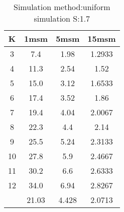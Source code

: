 \begin{table}[H]
\centering
\begin{tabular}{c|ccc}
K &1msm &5msm &15msm\\
\hline
3 & 7.4 & 1.98 & 1.2933\\
4 & 11.3 & 2.54 & 1.52\\
5 & 15.0 & 3.12 & 1.6533\\
6 & 17.4 & 3.52 & 1.86\\
7 & 19.4 & 4.04 & 2.0067\\
8 & 22.3 & 4.4 & 2.14\\
9 & 25.5 & 5.24 & 2.3133\\
10 & 27.8 & 5.9 & 2.4667\\
11 & 30.2 & 6.6 & 2.6333\\
12 & 34.0 & 6.94 & 2.8267\\
\hline
& 21.03 & 4.428 & 2.0713\\
\end{tabular}
\caption{Simulation method:uniform simulation S:1.7}
\label{tab:s1.7}
\end{table}
